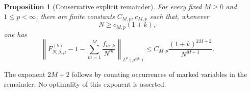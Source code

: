 \documentclass[11pt,reqno]{amsart}
\numberwithin{equation}{section}
\theoremstyle{plain}
\newtheorem{prop}[prop]{Proposition}
\theoremstyle{definition}
\newcommand{\be}{\beta}
\begin{document}
\begin{prop}[Conservative explicit remainder]
\label{prop:prescribed-k-remainder}
For every fixed $M\geq0$ and $1\leq p<\infty$, there are finite constants $C_{M,p},c_{M,p}$ such that, whenever
\begin{equation}
 N\geq c_{M,p}(1+k),
 \label{eq:prescribed-k-remainder-range}
\end{equation}
one has
\begin{equation}
 \left\|F_{N,\be,\mu}^{(k)}-1
 -\sum_{m=1}^{M}\frac{f_{m,k}}{N^m}\right\|_{L^p(\mu^{\otimes k})}
 \leq C_{M,p}\frac{(1+k)^{2M+2}}{N^{M+1}}.
 \label{eq:prescribed-explicit-k-remainder}
\end{equation}
\end{prop}

The exponent $2M+2$ follows by counting occurrences of marked variables in the remainder. No optimality of this exponent is asserted.
\end{document}
